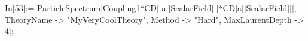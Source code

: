 In[53]:= ParticleSpectrum[Coupling1*CD[-a][ScalarField[]]*CD[a][ScalarField[]], TheoryName -> "MyVeryCoolTheory", Method -> "Hard", MaxLaurentDepth -> 4]; 